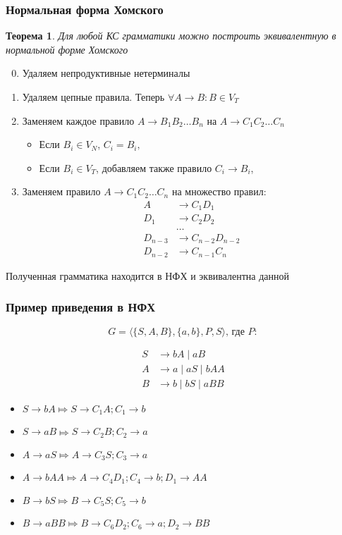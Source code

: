 \documentclass{beamer}
\newtheorem{rutheorem}{Теорема}
\begin{document}
\begin{frame}[fragile]
  \transwipe[direction=90]
  \frametitle{Нормальная форма Хомского}

  \begin{rutheorem}
    Для любой КС грамматики можно построить эквивалентную в нормальной форме Хомского
  \end{rutheorem}

     \begin{enumerate}
      \setcounter{enumi}{-1}
    \item Удаляем непродуктивные нетерминалы
    \item Удаляем цепные правила. Теперь $\forall A \to B: B \in V_T$
    \item Заменяем каждое правило $A \to B_1 B_2 \dots B_n$ на $A \to C_1 C_2 \dots C_n$
    \begin{itemize}
      \item Если $B_i \in V_N$, $C_i = B_i,$
      \item Если $B_i \in V_T$, добавляем также правило $C_i \to B_i$,
    \end{itemize}
    \item Заменяем правило $A \to C_1 C_2 \dots C_n$ на множество правил:
    {\small
    \begin{align*}
      A   &\to C_1 D_1 \\
      D_1 &\to C_2 D_2 \\
          &\dots \\
      D_{n-3} &\to C_{n-2} D_{n-2} \\
      D_{n-2} &\to C_{n-1} C_n
    \end{align*}
    }%
  \end{enumerate}

        Полученная грамматика находится в НФХ и эквивалентна данной
\end{frame}

\begin{frame}[fragile]
  \transwipe[direction=90]
  \frametitle{Пример приведения в НФХ}
  \[G = \langle \{S, A, B\}, \{a, b\}, P, S\rangle \text{, где } P:\]

\begin{align*}
  S &\to bA \mid aB \\
  A &\to a  \mid aS \mid bAA  \\
  B &\to b  \mid bS \mid aBB
\end{align*}

  \begin{itemize}
    \item $S \to b A \Mapsto S \to C_1 A; C_1 \to b$
    \item $S \to a B \Mapsto S \to C_2 B; C_2 \to a$
    \item $A \to aS \Mapsto A \to C_3 S; C_3 \to a$
    \item $A \to b A A \Mapsto A \to C_4 D_1; C_4 \to b; D_1 \to A A$
    \item $B \to b S \Mapsto B \to C_5 S; C_5 \to b$
    \item $B \to a B B \Mapsto B \to C_6 D_2; C_6 \to a; D_2 \to B B$
  \end{itemize}
\end{frame}
\end{document}
